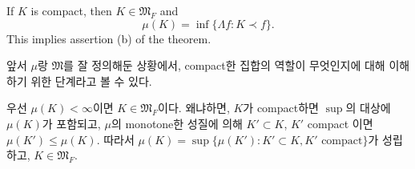 \documentclass[11pt,reqno]{amsart}
\renewcommand{\(}{\left(}
\renewcommand{\)}{\right)}
\renewcommand{\[}{\left[}
\renewcommand{\]}{\right]}
\newenvironment{textbox}
  {\begin{tcolorbox}[
    colback=gray!10, 
    colframe=gray!50, 
    boxrule=0.5pt,
    fontupper=\normalfont
  ]}
  {\end{tcolorbox}}
\newcommand{\subheading}[1]{\vspace{1em}{\noindent\large\bfseries \textlangle{} #1 \textrangle{} \par}\vspace{1em}}
\newcommand{\M}{\mathfrak{M}}
\begin{document}
\begin{textbox}
  If $K$ is compact, then $K \in \M_F$ and \begin{equation}
    \mu(K) = \inf \{ \Lambda f : K \prec f \}.
  \end{equation}
  This implies assertion (b) of the theorem.
\end{textbox}

앞서 $\mu$랑 $\M$를 잘 정의해둔 상황에서, compact한 집합의 역할이 무엇인지에 대해 이해하기 위한 단계라고 볼 수 있다. 

\subheading{proof}

우선 $\mu(K) < \infty$이면 $K \in \M_F$이다. 왜냐하면, $K$가 compact하면 $\sup$의 대상에 $\mu(K)$가 포함되고, 
$\mu$의 monotone한 성질에 의해 $K' \subset K$, $K'$ compact 이면 $\mu(K') \le \mu(K)$. 따라서 
$\mu(K) = \sup \{ \mu(K') : K' \subset K, K' \text{ compact} \}$가 성립하고, $K \in \M_F$. \\ \\
\end{document}

